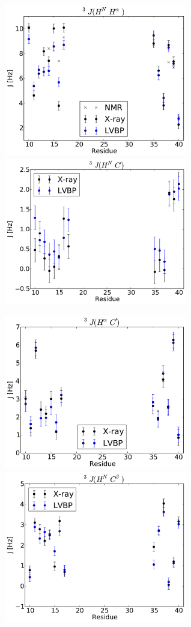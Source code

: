 \documentclass[journal=jacsat,manuscript=article]{achemso}
\begin{document}
\newpage

\begin{figure}
\includegraphics[width=8cm]{figures/BPTI_couplings_J3_HN_HA.pdf}
\includegraphics[width=8cm]{figures/BPTI_couplings_J3_HN_Cprime.pdf}

\includegraphics[width=8cm]{figures/BPTI_couplings_J3_HA_Cprime.pdf}
\includegraphics[width=8cm]{figures/BPTI_couplings_J3_HN_CB.pdf}


\end{figure}
\end{document}
